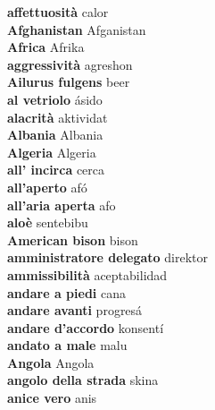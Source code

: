 \textbf{ affettuosità  } calor \\
\textbf{ Afghanistan  } Afganistan \\
\textbf{ Africa  } Afrika \\
\textbf{ aggressività  } agreshon \\
\textbf{ Ailurus fulgens  } beer \\
\textbf{ al vetriolo  } ásido \\
\textbf{ alacrità  } aktividat \\
\textbf{ Albania  } Albania \\
\textbf{ Algeria  } Algeria \\
\textbf{ all’ incirca  } cerca \\
\textbf{ all’aperto  } afó \\
\textbf{ all’aria aperta  } afo \\
\textbf{ aloè  } sentebibu \\
\textbf{ American bison  } bison \\
\textbf{ amministratore delegato  } direktor \\
\textbf{ ammissibilità  } aceptabilidad \\
\textbf{ andare a piedi  } cana \\
\textbf{ andare avanti  } progresá \\
\textbf{ andare d’accordo  } konsentí \\
\textbf{ andato a male  } malu \\
\textbf{ Angola  } Angola \\
\textbf{ angolo della strada  } skina \\
\textbf{ anice vero  } anis \\
